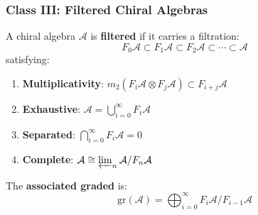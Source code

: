 \subsubsection{Class III: Filtered Chiral Algebras}

\begin{definition}\label{def:filtered-chiral}
A chiral algebra $\mathcal{A}$ is \textbf{filtered} if it carries a filtration:
\begin{equation}
F_0\mathcal{A} \subset F_1\mathcal{A} \subset F_2\mathcal{A} \subset \cdots \subset \mathcal{A}
\end{equation}
satisfying:
\begin{enumerate}
\item \textbf{Multiplicativity}: $m_2(F_i\mathcal{A} \otimes F_j\mathcal{A}) \subset F_{i+j}\mathcal{A}$
\item \textbf{Exhaustive}: $\mathcal{A} = \bigcup_{i=0}^\infty F_i\mathcal{A}$
\item \textbf{Separated}: $\bigcap_{i=0}^\infty F_i\mathcal{A} = 0$
\item \textbf{Complete}: $\mathcal{A} \cong \varprojlim_n \mathcal{A}/F_n\mathcal{A}$
\end{enumerate}

The \textbf{associated graded} is:
\begin{equation}
\text{gr}(\mathcal{A}) = \bigoplus_{i=0}^\infty F_i\mathcal{A}/F_{i-1}\mathcal{A}
\end{equation}
\end{definition}

